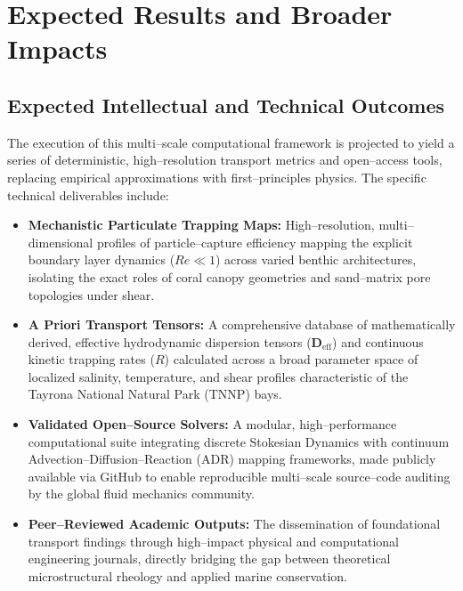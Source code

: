 \section{Expected Results and Broader Impacts}
\label{sec:results_impacts}

\subsection{Expected Intellectual and Technical Outcomes}
The execution of this multi--scale computational framework is projected to yield a series of deterministic, high--resolution transport metrics and open--access tools, replacing empirical approximations with first--principles physics. The specific technical deliverables include:
\begin{itemize}
    \item \textbf{Mechanistic Particulate Trapping Maps:} High--resolution, multi--dimensional profiles of particle--capture efficiency mapping the explicit boundary layer dynamics ($Re \ll 1$) across varied benthic architectures, isolating the exact roles of coral canopy geometries and sand--matrix pore topologies under shear.
    \item \textbf{A Priori Transport Tensors:} A comprehensive database of mathematically derived, effective hydrodynamic dispersion tensors ($\bm{D}_{\text{eff}}$) and continuous kinetic trapping rates ($R$) calculated across a broad parameter space of localized salinity, temperature, and shear profiles characteristic of the Tayrona National Natural Park (TNNP) bays.
    \item \textbf{Validated Open--Source Solvers:} A modular, high--performance computational suite integrating discrete Stokesian Dynamics with continuum Advection--Diffusion--Reaction (ADR) mapping frameworks, made publicly available via GitHub to enable reproducible multi--scale source--code auditing by the global fluid mechanics community.
    \item \textbf{Peer--Reviewed Academic Outputs:} The dissemination of foundational transport findings through high--impact physical and computational engineering journals, directly bridging the gap between theoretical microstructural rheology and applied marine conservation.
\end{itemize}

